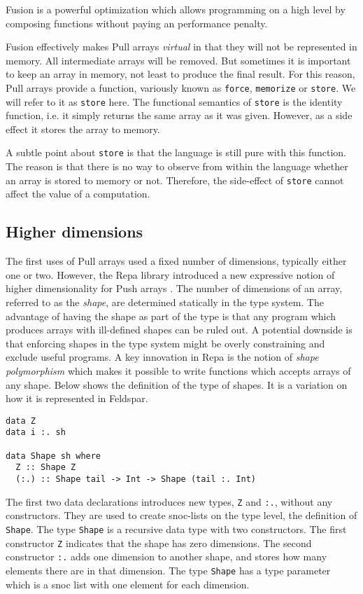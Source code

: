 \documentclass{sigplanconf}
\begin{document}
Fusion is a powerful optimization which allows programming on a high
level by composing functions without paying an performance penalty.

Fusion effectively makes Pull arrays \emph{virtual} in that they will
not be represented in memory. All intermediate arrays will be
removed. But sometimes it is important to keep an array in memory, not
least to produce the final result. For this reason, Pull arrays
provide a function, variously known as \verb!force!, \verb!memorize!
  or \verb!store!. We will refer to it as \verb!store! here. The
  functional semantics of \verb!store! is the identity function,
  i.e. it simply returns the same array as it was given. However, as a
  side effect it stores the array to memory.

A subtle point about \verb!store! is that the language is still pure
with this function. The reason is that there is no way to observe from
within the language whether an array is stored to memory or
not. Therefore, the side-effect of \verb!store! cannot affect the
value of a computation.

\subsection{Higher dimensions}

The first uses of Pull arrays used a fixed number of dimensions,
typically either one or two. However, the Repa library introduced a
new expressive notion of higher dimensionality for Push arrays
\cite{keller2010regular}. The number of dimensions of an array, referred
to as the \emph{shape}, are determined statically in the type
system. The advantage of having the shape as part of the type is that
any program which produces arrays with ill-defined shapes can be ruled
out. A potential downside is that enforcing shapes in the type system might
be overly constraining and exclude useful programs. A key innovation in
Repa is the notion of \emph{shape polymorphism} which makes it
possible to write functions which accepts arrays of any shape. Below
shows the definition of the type of shapes. It is a variation on how
it is represented in Feldspar.

\begin{verbatim}
data Z
data i :. sh

data Shape sh where
  Z :: Shape Z
  (:.) :: Shape tail -> Int -> Shape (tail :. Int)
\end{verbatim}

The first two data declarations introduces new types, \verb!Z! and
\verb!:.!, without any constructors. They are used to create
snoc-lists on the type level, the definition of \verb!Shape!.  The
type \verb!Shape! is a recursive data type with two constructors. The
first constructor \verb!Z! indicates that the shape has zero
dimensions.  The second constructor \verb!:.! adds one dimension to
another shape, and stores how many elements there are in that
dimension. The type \verb!Shape! has a type parameter which is a snoc
list with one element for each dimension.
\end{document}
